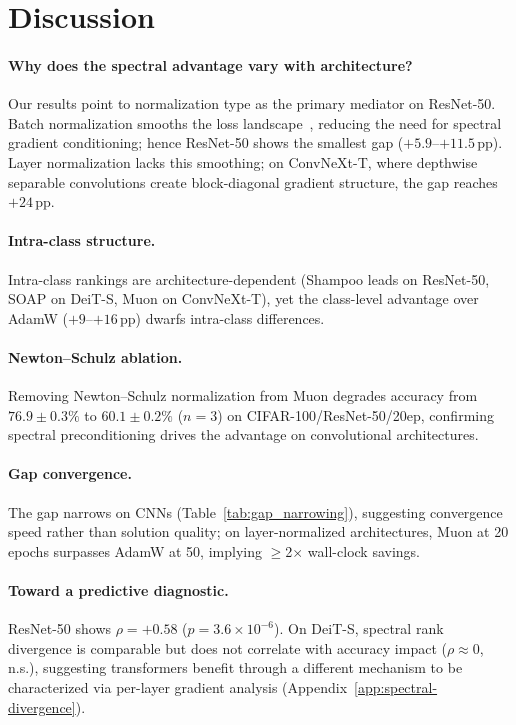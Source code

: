 \enlargethispage{\baselineskip}
\vspace{-0.5em}
\section{Discussion}
\label{sec:discussion}
\vspace{-0.3em}

\paragraph{Why does the spectral advantage vary with architecture?}
Our results point to normalization type as the primary mediator on ResNet-50.
Batch normalization smooths the loss landscape~\cite{santurkar2018how}, reducing the need for spectral gradient conditioning; hence ResNet-50 shows the smallest gap ($+5.9$--$+11.5$\,pp).
Layer normalization lacks this smoothing; on ConvNeXt-T, where depthwise separable convolutions create block-diagonal gradient structure, the gap reaches $+24$\,pp.

\paragraph{Intra-class structure.}
Intra-class rankings are architecture-dependent (Shampoo leads on ResNet-50, SOAP on DeiT-S, Muon on ConvNeXt-T), yet the class-level advantage over AdamW ($+9$--$+16$\,pp) dwarfs intra-class differences.

\paragraph{Newton--Schulz ablation.}
Removing Newton--Schulz normalization from Muon degrades accuracy from $76.9\pm0.3\%$ to $60.1\pm0.2\%$ ($n{=}3$) on CIFAR-100/ResNet-50/20ep, confirming spectral preconditioning drives the advantage on convolutional architectures.

\paragraph{Gap convergence.}
The gap narrows on CNNs (Table~\ref{tab:gap_narrowing}), suggesting convergence speed rather than solution quality; on layer-normalized architectures, Muon at 20 epochs surpasses AdamW at 50, implying $\geq$2$\times$ wall-clock savings.

\paragraph{Toward a predictive diagnostic.}
ResNet-50 shows $\rho = +0.58$ ($p = 3.6 \times 10^{-6}$).
On DeiT-S, spectral rank divergence is comparable but does not correlate with accuracy impact ($\rho \approx 0$, n.s.), suggesting transformers benefit through a different mechanism to be characterized via per-layer gradient analysis (Appendix~\ref{app:spectral-divergence}).

